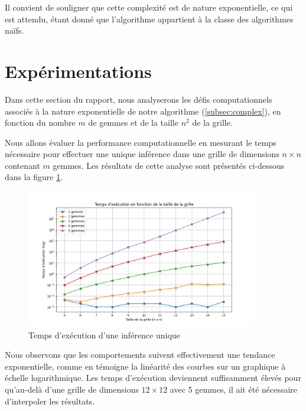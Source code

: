 \documentclass{article}
\begin{document}
\noindent Il convient de souligner que cette complexité est de nature exponentielle, ce qui est attendu, étant donné que l'algorithme appartient à la classe des algorithmes naïfs.



\section{Expérimentations}

\noindent Dans cette section du rapport, nous analyserons les défis computationnels associés à la nature exponentielle de notre algorithme (\ref{subsec:complex}), en fonction du nombre \( m \) de gemmes et de la taille \( n^2 \) de la grille.

\vspace{1em}

\noindent Nous allons évaluer la performance computationnelle en mesurant le temps nécessaire pour effectuer une unique inférence dans une grille de dimensions \( n \times n \) contenant \( m \) gemmes. Les résultats de cette analyse sont présentés ci-dessous dans la figure \ref{fig:exp_inf}.

\begin{figure}[h]
    \centering
    \includegraphics[width=0.9\textwidth]{src/exp.png}
    \caption{Temps d'exécution d'une inférence unique}
    \label{fig:exp_inf}
\end{figure}

\noindent Nous observons que les comportements suivent effectivement une tendance exponentielle, comme en témoigne la linéarité des courbes sur un graphique à échelle logarithmique. Les temps d'exécution deviennent suffisamment élevés pour qu'au-delà d'une grille de dimensions \( 12 \times 12 \) avec 5 gemmes, il ait été nécessaire d'interpoler les résultats.
\end{document}
